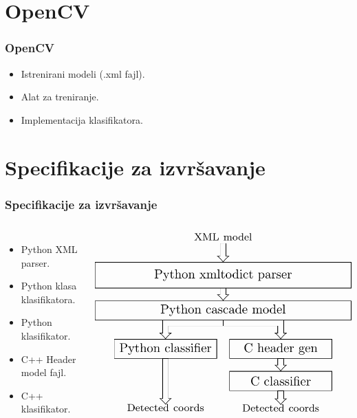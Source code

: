 \documentclass{beamer}
\begin{document}
\section{OpenCV}
\begin{frame}
  \frametitle{OpenCV}

  \begin{itemize}
  \item<1-> Istrenirani modeli (.xml fajl).
  \item<1-> Alat za treniranje.
  \item<1-> Implementacija klasifikatora.
  \end{itemize}

\end{frame}

\section{Specifikacije za izvršavanje}
\begin{frame}
  \frametitle{Specifikacije za izvršavanje}
  \begin{columns}[onlytextwidth,T]
    \column{\dimexpr\linewidth-55mm-2mm}
    \begin{itemize}
    \item<1-> Python XML parser.
    \item<1-> Python klasa klasifikatora.
    \item<1-> Python klasifikator.
    \item<1-> C++ Header model fajl.
    \item<1-> C++ klasifikator.
    \end{itemize}

    \column{80mm}
    \begin{overprint}
      \includegraphics[width=0.77\linewidth]{../images/bdp/sw_arch/sw_arch1}
    \end{overprint}

  \end{columns}

\end{frame}
\end{document}
